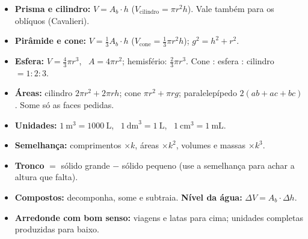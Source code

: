 \begin{resumo}
\begin{itemize}[leftmargin=1.2em,itemsep=2pt]
  \item \textbf{Prisma e cilindro:} $V = A_b\cdot h$ \quad ($V_{\text{cilindro}} = \pi r^2 h$). Vale também para os oblíquos (Cavalieri).
  \item \textbf{Pirâmide e cone:} $V = \frac13 A_b\cdot h$ \quad ($V_{\text{cone}} = \frac13\pi r^2 h$); \quad $g^2 = h^2 + r^2$.
  \item \textbf{Esfera:} $V = \frac43\pi r^3$, \ $A = 4\pi r^2$; hemisfério: $\frac23\pi r^3$. Cone : esfera : cilindro $= 1:2:3$.
  \item \textbf{Áreas:} cilindro $2\pi r^2 + 2\pi r h$; cone $\pi r^2 + \pi r g$; paralelepípedo $2(ab+ac+bc)$. Some só as faces pedidas.
  \item \textbf{Unidades:} $1\ \text{m}^3 = 1000\ \text{L}$, \ $1\ \text{dm}^3 = 1\ \text{L}$, \ $1\ \text{cm}^3 = 1\ \text{mL}$.
  \item \textbf{Semelhança:} comprimentos $\times k$, áreas $\times k^2$, volumes e massas $\times k^3$.
  \item \textbf{Tronco} $=$ sólido grande $-$ sólido pequeno (use a semelhança para achar a altura que falta).
  \item \textbf{Compostos:} decomponha, some e subtraia. \textbf{Nível da água:} $\Delta V = A_b\cdot\Delta h$.
  \item \textbf{Arredonde com bom senso:} viagens e latas para cima; unidades completas produzidas para baixo.
\end{itemize}
\end{resumo}

\secaoenem

